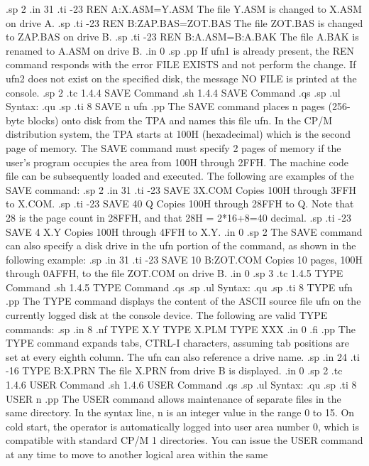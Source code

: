 .sp 2
.in 31
.ti -23
REN A:X.ASM=Y.ASM      The file Y.ASM is changed to X.ASM on drive A.
.sp
.ti -23
REN B:ZAP.BAS=ZOT.BAS  The file ZOT.BAS is changed to ZAP.BAS on drive B.
.sp
.ti -23
REN B:A.ASM=B:A.BAK    The file A.BAK is renamed to A.ASM on drive B.
.in 0
.sp
.pp
If ufn1 is already present, the REN command responds with the 
error FILE EXISTS and not perform the change.  If ufn2 does not exist on 
the specified disk, the message NO FILE is printed at the console.
.sp 2
.tc         1.4.4  SAVE Command
.sh
1.4.4  SAVE Command
.qs
.sp
.ul
Syntax:
.qu
.sp
.ti 8
SAVE n ufn
.pp
The SAVE command places n pages (256-byte blocks) onto disk from the TPA 
and names this file ufn.  In the CP/M distribution system, the TPA starts 
at 100H (hexadecimal) which is the second page of memory.  The SAVE command 
must specify 2 pages of memory if the user's program occupies the area 
from 100H through 2FFH.  The machine code file can be subsequently loaded 
and executed.  The following are examples of the SAVE command:
.sp 2
.in 31
.ti -23
SAVE 3X.COM            Copies 100H through 3FFH to X.COM.
.sp
.ti -23
SAVE 40 Q              Copies 100H through 28FFH to Q.  Note that 28 is the 
page count in 28FFH, and that 28H = 2*16+8=40 decimal.
.sp
.ti -23
SAVE 4 X.Y             Copies 100H through 4FFH to X.Y.
.in 0
.sp 2
The SAVE command can also specify a disk drive in the ufn portion of the 
command, as shown in the following example:
.sp 
.in 31
.ti -23
SAVE 10 B:ZOT.COM      Copies 10 pages, 100H through 0AFFH, to the 
file ZOT.COM on drive B.
.in 0
.sp 3
.tc         1.4.5  TYPE Command
.sh
1.4.5  TYPE Command
.qs
.sp
.ul
Syntax:
.qu
.sp
.ti 8
TYPE ufn
.pp
The TYPE command displays the content of the ASCII source file ufn on the 
currently logged disk at the console device.  The following are valid 
TYPE commands:
.sp
.in 8
.nf
TYPE X.Y
TYPE X.PLM
TYPE XXX
.in 0
.fi
.pp
The TYPE command expands tabs, CTRL-I characters, assuming tab positions are 
set at every eighth column.  The ufn can also reference a drive name.
.sp
.in 24
.ti -16
TYPE B:X.PRN    The file X.PRN from drive B is displayed.
.in 0
.sp 2
.tc         1.4.6  USER Command
.sh
1.4.6  USER Command
.qs
.sp
.ul
Syntax:
.qu
.sp
.ti 8
USER n
.pp
The USER command allows maintenance of separate files in the same 
directory.  In the syntax line, n is an integer value in the range 0 to 
15.  On cold start, the operator is automatically logged into user 
area number 0, which is 
compatible with standard CP/M 1 directories.  You can issue the 
USER command at any time to move to another logical area within the same 
